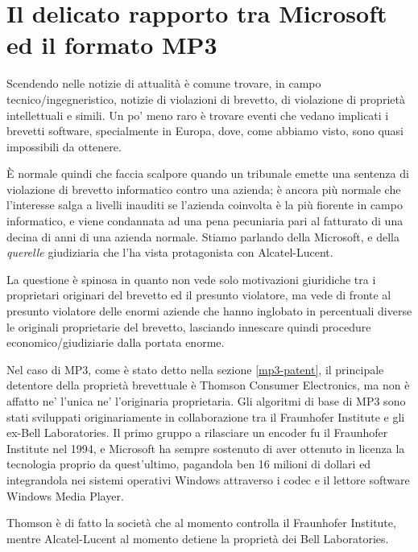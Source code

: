 \section{Il delicato rapporto tra Microsoft ed il formato MP3}
Scendendo nelle notizie di attualità è comune trovare, in campo tecnico/ingegneristico, notizie di violazioni di brevetto, di violazione di proprietà intellettuali e simili. Un po' meno raro è trovare eventi che vedano implicati i brevetti software, specialmente in Europa, dove, come abbiamo visto, sono quasi impossibili da ottenere. 

\`E normale quindi che faccia scalpore quando un tribunale emette una sentenza di violazione di brevetto informatico contro una azienda; è ancora più normale che l'interesse salga a livelli inauditi se l'azienda coinvolta è la più fiorente in campo informatico, e viene condannata ad una pena pecuniaria pari al fatturato di una decina di anni di una azienda normale. Stiamo parlando della Microsoft, e della \textit{querelle} giudiziaria che l'ha vista protagonista con Alcatel-Lucent.

La questione è spinosa in quanto non vede solo motivazioni giuridiche tra i proprietari originari del brevetto ed il presunto violatore, ma vede di fronte al presunto violatore delle enormi aziende che hanno inglobato in percentuali diverse le originali proprietarie del brevetto, lasciando innescare quindi procedure economico/giudiziarie dalla portata enorme.

Nel caso di MP3, come è stato detto nella sezione \ref{mp3-patent}, il principale detentore della proprietà brevettuale è Thomson Consumer Electronics, ma non è affatto ne' l'unica ne' l'originaria proprietaria. Gli algoritmi di base di MP3 sono stati sviluppati originariamente in collaborazione tra il Fraunhofer Institute e gli ex-Bell Laboratories. Il primo gruppo a rilasciare un encoder fu il Fraunhofer Institute nel 1994, e Microsoft ha sempre sostenuto di aver ottenuto in licenza la tecnologia proprio da quest'ultimo, pagandola ben 16 milioni di dollari ed integrandola nei sistemi operativi Windows attraverso i codec e il lettore software Windows Media Player.

Thomson è di fatto la società che al momento controlla il Fraunhofer Institute, mentre Alcatel-Lucent al momento detiene la proprietà dei Bell Laboratories.

